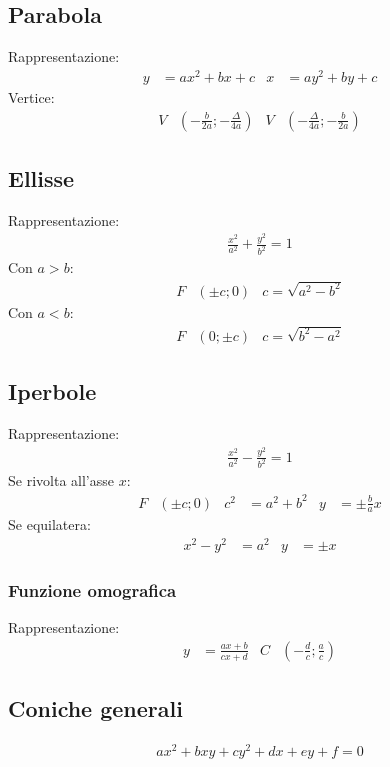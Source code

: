 \documentclass[a4paper]{article}
\begin{document}
	\subsection{Parabola}
	Rappresentazione:
	\begin{align*}
		y &= ax^2 + bx + c		&		x &= ay^2 + by + c
	\end{align*}
	Vertice:
	\begin{align*}
		V& \left(-\frac{b}{2a};-\frac{\varDelta}{4a}\right)		&		V & \left( -\frac{\varDelta}{4a} ; -\frac{b}{2a} \right) 
	\end{align*}
	
	\subsection{Ellisse}
	Rappresentazione:
	\begin{align*}
		\frac{x^2}{a^2} + \frac{y^2}{b^2} = 1
	\end{align*}
	Con $a>b$:
	\begin{align*}
		F&(\pm c ; 0)		&		c = \sqrt{a^2-b^2}
	\end{align*}
	Con $a < b$:
	\begin{align*}
		F&(0 ; \pm c)		&		c = \sqrt{b^2-a^2}
	\end{align*}
	
	\subsection{Iperbole}
	Rappresentazione:
	\begin{align*}
	\frac{x^2}{a^2} - \frac{y^2}{b^2} = 1
	\end{align*}
	Se rivolta all'asse $x$:
	\begin{align*}
		F&(\pm c ; 0)		&		c^2 &= a^2 + b^2		&		y &= \pm \frac{b}{a}x
	\end{align*}
	Se equilatera:
	\begin{align*}
		x^2 - y^2 &= a^2		&		y &= \pm x
	\end{align*}
	
	\subsubsection{Funzione omografica}
	Rappresentazione:
	\begin{align*}
	y &= \frac{ax + b}{cx + d}		&		C&\left( -\frac{d}{c} ; \frac{a}{c} \right)
	\end{align*}
	
	\subsection{Coniche generali}
	\begin{align*}
		ax^2+bxy+cy^2+dx+ey+f=0
	\end{align*}
	
\end{document}

